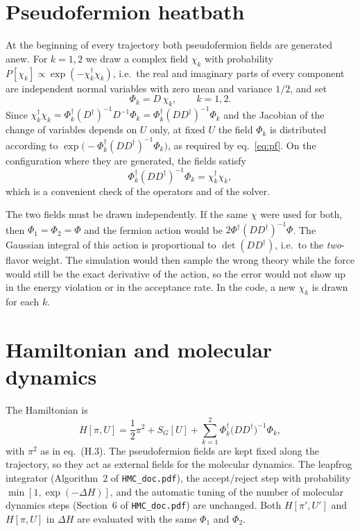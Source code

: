 \documentclass[11pt,a4paper]{article}
\newcommand{\hmcdoc}{\texttt{HMC\_doc.pdf}}
\begin{document}
\section{Pseudofermion heatbath}
\label{sec:heatbath}

At the beginning of every trajectory both pseudofermion fields are generated anew. For $k = 1,2$ we draw a
complex field $\chi_k$ with probability $P[\chi_k] \propto \exp(-\chi_k^\dagger\chi_k)$, i.e.\ the real and
imaginary parts of every component are independent normal variables with zero mean and variance $1/2$, and set
\begin{equation}
    \Phi_k = D\,\chi_k, \qquad k = 1,2.
    \label{eq:heatbath}
\end{equation}
Since $\chi_k^\dagger\chi_k = \Phi_k^\dagger (D^\dagger)^{-1} D^{-1}\Phi_k = \Phi_k^\dagger (DD^\dagger)^{-1}\Phi_k$
and the Jacobian of the change of variables depends on $U$ only, at fixed $U$ the field $\Phi_k$ is distributed
according to $\exp\bigl(-\Phi_k^\dagger(DD^\dagger)^{-1}\Phi_k\bigr)$, as required by eq.~\eqref{eq:pf}. On the
configuration where they are generated, the fields satisfy
\begin{equation}
    \Phi_k^\dagger (DD^\dagger)^{-1}\Phi_k = \chi_k^\dagger\chi_k ,
    \label{eq:identity}
\end{equation}
which is a convenient check of the operators and of the solver.

The two fields must be drawn independently. If the same $\chi$ were used for both, then $\Phi_1 = \Phi_2 = \Phi$
and the fermion action would be $2\Phi^\dagger(DD^\dagger)^{-1}\Phi$. The Gaussian integral of this action is
proportional to $\det(DD^\dagger)$, i.e.\ to the \emph{two}-flavor weight. The simulation would then sample the
wrong theory while the force would still be the exact derivative of the action, so the error would not show up in
the energy violation or in the acceptance rate. In the code, a new $\chi_k$ is drawn for each $k$.

\section{Hamiltonian and molecular dynamics}
\label{sec:md}

The Hamiltonian is
\begin{equation}
    H[\pi,U] = \frac{1}{2}\pi^2 + S_G[U] + \sum_{k=1}^{2} \Phi_k^\dagger \bigl(DD^\dagger\bigr)^{-1} \Phi_k ,
    \label{eq:H}
\end{equation}
with $\pi^2$ as in eq.~(H.3). The pseudofermion fields are kept fixed along the trajectory, so they act as
external fields for the molecular dynamics. The leapfrog integrator (Algorithm~2 of \hmcdoc), the
accept/reject step with probability $\min[1,\exp(-\Delta H)]$, and the automatic tuning of the number of
molecular dynamics steps (Section~6 of \hmcdoc) are unchanged. Both $H[\pi',U']$ and $H[\pi,U]$ in
$\Delta H$ are evaluated with the same $\Phi_1$ and $\Phi_2$.
\end{document}
